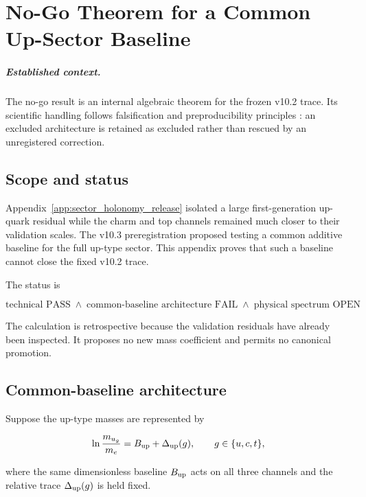 \chapter{No-Go Theorem for a Common Up-Sector Baseline}
\label{app:up_sector_common_baseline_no_go}


\paragraph{Established context.}
The no-go result is an internal algebraic theorem for the frozen v10.2 trace.
Its scientific handling follows falsification and preproducibility principles
\cite{Popper1959,Lakatos1978,Nosek2018,Stark2018}: an excluded architecture is
retained as excluded rather than rescued by an unregistered correction.

\section{Scope and status}

Appendix~\ref{app:sector_holonomy_release} isolated a large first-generation
up-quark residual while the charm and top channels remained much closer to their
validation scales.  The v10.3 preregistration proposed testing a common additive
baseline for the full up-type sector.  This appendix proves that such a baseline
cannot close the fixed v10.2 trace.

The status is

\[
\boxed{
\text{technical PASS}
\;\land\;
\text{common-baseline architecture FAIL}
\;\land\;
\text{physical spectrum OPEN}
}
\]

The calculation is retrospective because the validation residuals have already
been inspected.  It proposes no new mass coefficient and permits no canonical
promotion.

\section{Common-baseline architecture}

Suppose the up-type masses are represented by

\begin{equation}
\ln\frac{m_{u_g}}{m_e}
=
B_{\rm up}+\Delta_{\rm up}(g),
\qquad g\in\{u,c,t\},
\label{eq:common_up_baseline}
\end{equation}

where the same dimensionless baseline $B_{\rm up}$ acts on all three channels
and the relative trace $\Delta_{\rm up}(g)$ is held fixed.

